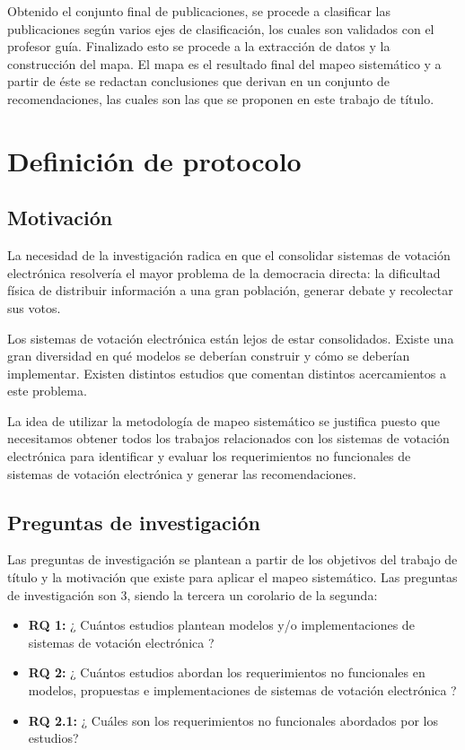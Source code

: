 Obtenido el conjunto final de publicaciones, se procede a clasificar las publicaciones
según varios ejes de clasificación, los cuales son validados con el profesor guía. Finalizado
esto se procede a la extracción de datos y la construcción del mapa. El mapa es 
el resultado final del mapeo sistemático y a partir de éste se redactan conclusiones
que derivan en un conjunto de recomendaciones, las cuales son las que se proponen
en este trabajo de título.


\section{Definición de protocolo}

\subsection{Motivación}

La necesidad de la investigación radica en que el consolidar sistemas de votación 
electrónica resolvería el mayor problema de la democracia directa: la dificultad 
física de distribuir información a una gran población, generar debate y recolectar 
sus votos.
	
Los sistemas de votación electrónica  están lejos de estar consolidados. Existe 
una gran diversidad en qué modelos se deberían construir y cómo se deberían 
implementar. Existen distintos estudios que comentan distintos acercamientos 
a este problema. 
	
La idea de utilizar la metodología de mapeo sistemático se justifica puesto que 
necesitamos obtener todos los trabajos relacionados con los sistemas de 
votación electrónica para identificar y evaluar los requerimientos no funcionales 
de sistemas de votación electrónica y generar las recomendaciones. 

\subsection{Preguntas de investigación}

Las preguntas de investigación se plantean a partir de los objetivos del trabajo de título y la motivación
que existe para aplicar el mapeo sistemático. Las preguntas de investigación son 3, siendo la tercera
un corolario de la segunda:

\begin{itemize}

\item \textbf{RQ 1: }¿ Cuántos estudios plantean modelos y/o implementaciones de sistemas 
de votación electrónica ?

\item \textbf{RQ 2: }¿ Cuántos estudios abordan los requerimientos no funcionales en modelos, 
propuestas e implementaciones de sistemas de votación electrónica ?

\item \textbf{RQ 2.1: }¿ Cuáles son los requerimientos no funcionales abordados por los estudios?

\end{itemize}

